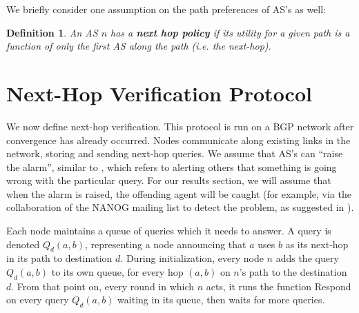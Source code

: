 \documentclass[10pt]{article}
\newtheorem{definition}{Definition}
\begin{document}
    We briefly consider one assumption on the path preferences of AS's as well:
    \begin{definition}
      An AS $n$ has a \textbf{next hop policy} if its utility for a given path
      is a function of only the first AS along the path (i.e. the next-hop).
    \end{definition}

\section{Next-Hop Verification Protocol}
  We now define next-hop verification.
  This protocol is run on a BGP network after convergence has already occurred.
  Nodes communicate along existing links in the network, storing and sending
  next-hop queries. We assume that AS's can ``raise the alarm'', similar to
  \cite{Attraction}, which refers to alerting others that something
  is going wrong with the particular query. For our results section,
  we will assume that when the alarm is raised, the offending agent will be
  caught (for example, via the collaboration of the NANOG mailing list to detect
  the problem, as suggested in \cite{Attraction}).

  Each node maintains a queue of queries which it needs to answer.
  A query is denoted $Q_d(a,b)$, representing a node announcing that
  $a$ uses $b$ as its next-hop in its path to destination $d$.
  During initialization, every node $n$ adds the query $Q_d(a,b)$ to its own
  queue, for every hop $(a,b)$ on $n$'s path to the destination $d$.
  From that point on, every round in which $n$ acts, it runs the function
  {\sc Respond} on every query $Q_d(a,b)$ waiting in its queue, then waits for more queries.
\end{document}
